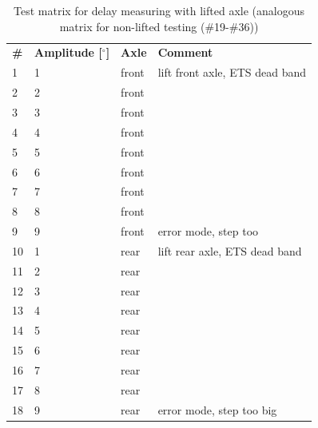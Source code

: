 \documentclass[ExampleMasters.tex]{subfiles}
\begin{document}
	\begin{table}[h]
		\label{tab:test_matrx_delay_measuring}
		\centering
		\begin{tabular}{llll}
			\textbf{\#} & \textbf{Amplitude [$  ^\circ $]} & \textbf{Axle}  & \textbf{Comment}                                                                  \\
			1  & 1                & front & lift front axle, ETS dead band \\
			2  & 2                & front &                                                                          \\
			3  & 3                & front &                                                                          \\
			4  & 4                & front &                                                                          \\
			5  & 5                & front &                                                                          \\
			6  & 6                & front &                                                                          \\
			7  & 7                & front &                                                                          \\
			8  & 8                & front &                                                                          \\
			9  & 9                & front & error mode, step too\footnotemark[1]                                      \\\hline
			10 & 1                & rear  & lift rear axle, ETS dead band  \\
			11 & 2                & rear &                                                                          \\
			12 & 3                & rear &                                                                          \\
			13 & 4                & rear &                                                                          \\
			14 & 5                & rear &                                                                          \\
			15 & 6                & rear &                                                                          \\
			16 & 7                & rear &                                                                          \\
			17 & 8                & rear &                                                                          \\
			18 & 9                & rear & error mode, step too big\footnotemark[1]                                                                   \\
			
		\end{tabular}
		\caption{Test matrix for delay measuring with lifted axle (analogous matrix for non-lifted testing (\#19-\#36))}
	\end{table}
\end{document}
